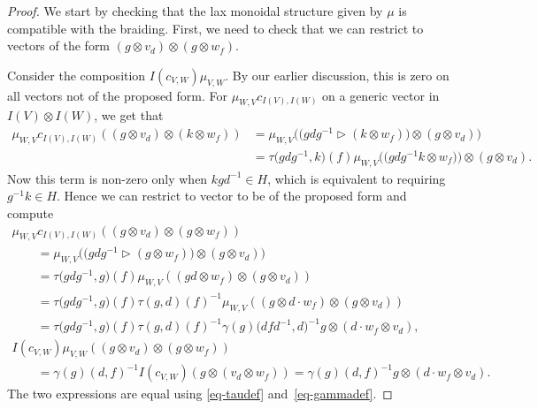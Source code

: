 \documentclass[pdftex]{sigma}
\numberwithin{equation}{section}
\newcommand{\rI}{I}
\begin{document}
\begin{proof}
We start by checking that the lax monoidal structure given by $\mu$ is compatible with the braiding. First, we need to check that we can restrict to vectors of the form $ ( g \otimes v_d ) \otimes (g \otimes w_f)$.

Consider the composition $\rI(c_{V,W})\mu_{V,W}$. By our earlier discussion, this is zero on all vectors not of the proposed form. For $\mu_{W,V}c_{\rI(V),\rI(W)}$ on a generic vector in $\rI(V) \otimes \rI(W)$, we get that
\begin{align*}
\mu_{W,V}c_{\rI(V),\rI(W)}(( g \otimes v_d ) \otimes (k \otimes w_f)) &= \mu_{W,V} \big(\big( gdg^{-1} \vartriangleright (k \otimes w_f)\big) \otimes (g \otimes v_d)\big) \\
 &= \tau\big(gdg^{-1},k\big)(f) \mu_{W,V} \big(\big( gdg^{-1}k \otimes w_f\big)\big) \otimes (g \otimes v_d).
\end{align*}
Now this term is non-zero only when $kgd^{-1} \in H$, which is equivalent to requiring $g^{-1}k \in H$. Hence we can restrict to vector to be of the proposed form and compute
\begin{gather*}
 \mu_{W,V}c_{\rI(V),\rI(W)}(( g \otimes v_d ) \otimes (g \otimes w_f)) \\
 \qquad{} = \mu_{W,V} \big(\big( gdg^{-1} \vartriangleright (g \otimes w_f)\big) \otimes (g \otimes v_d)\big) \\
 \qquad{} = \tau\big(gdg^{-1},g\big)(f) \mu_{W,V} ((gd \otimes w_f) \otimes (g \otimes v_d)) \\
\qquad{} = \tau\big(gdg^{-1},g\big)(f)\tau(g,d)(f)^{-1} \mu_{W,V} ((g \otimes d \cdot w_f) \otimes (g \otimes v_d))\\
\qquad{}{}=\tau\big(gdg^{-1},g\big)(f)\tau(g,d)(f)^{-1} \gamma(g)\big(dfd^{-1},d\big)^{-1} g \otimes (d \cdot w_f \otimes v_d),\\
 \rI(c_{V,W})\mu_{V,W} (( g \otimes v_d ) \otimes (g \otimes w_f)) \\
 \qquad{} = \gamma(g)(d,f)^{-1} \rI(c_{V,W}) (g \otimes (v_d \otimes w_f)) = \gamma(g)(d,f)^{-1} g \otimes (d \cdot w_f \otimes v_d).
\end{gather*}
The two expressions are equal using \eqref{eq-taudef} and~\eqref{eq-gammadef}.


\end{proof}
\end{document}
